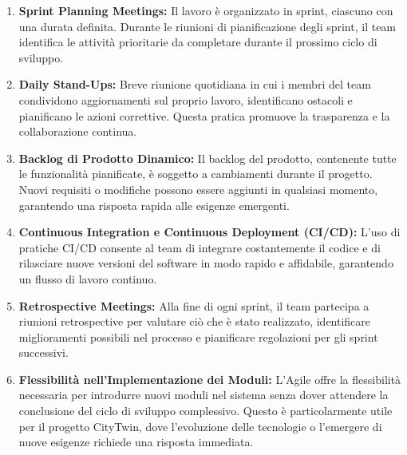 \begin{enumerate}
    \item \textbf{Sprint Planning Meetings:} Il lavoro è organizzato in sprint, ciascuno con una durata definita. Durante le riunioni di pianificazione degli sprint, il team identifica le attività prioritarie da completare durante il prossimo ciclo di sviluppo.

    \item \textbf{Daily Stand-Ups:} Breve riunione quotidiana in cui i membri del team condividono aggiornamenti sul proprio lavoro, identificano ostacoli e pianificano le azioni correttive. Questa pratica promuove la trasparenza e la collaborazione continua.

    \item \textbf{Backlog di Prodotto Dinamico:} Il backlog del prodotto, contenente tutte le funzionalità pianificate, è soggetto a cambiamenti durante il progetto. Nuovi requisiti o modifiche possono essere aggiunti in qualsiasi momento, garantendo una risposta rapida alle esigenze emergenti.

    \item \textbf{Continuous Integration e Continuous Deployment (CI/CD):} L'uso di pratiche CI/CD consente al team di integrare costantemente il codice e di rilasciare nuove versioni del software in modo rapido e affidabile, garantendo un flusso di lavoro continuo.

    \item \textbf{Retrospective Meetings:} Alla fine di ogni sprint, il team partecipa a riunioni retrospective per valutare ciò che è stato realizzato, identificare miglioramenti possibili nel processo e pianificare regolazioni per gli sprint successivi.

    \item \textbf{Flessibilità nell'Implementazione dei Moduli:} L'Agile offre la flessibilità necessaria per introdurre nuovi moduli nel sistema senza dover attendere la conclusione del ciclo di sviluppo complessivo. Questo è particolarmente utile per il progetto CityTwin, dove l'evoluzione delle tecnologie o l'emergere di nuove esigenze richiede una risposta immediata.
\end{enumerate}
